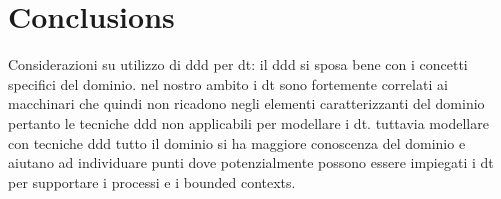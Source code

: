 \chapter{Conclusions}
Considerazioni su utilizzo di ddd per dt:
il ddd si sposa bene con i concetti specifici del dominio.
nel nostro ambito i dt sono fortemente correlati ai macchinari che quindi non ricadono negli elementi
caratterizzanti del dominio pertanto le tecniche ddd non applicabili per modellare i dt.
tuttavia modellare con tecniche ddd tutto il dominio si ha maggiore conoscenza del dominio e aiutano ad individuare
punti dove potenzialmente possono essere impiegati i dt per supportare i processi e i bounded contexts.
